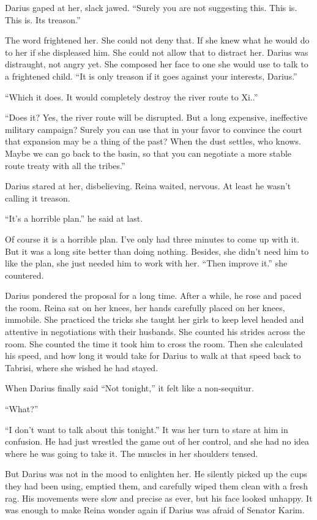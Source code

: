 \documentclass{article}
\begin{document}
	Darius gaped at her, slack jawed. “Surely you are not suggesting this. This is. This is. Its treason.”
	
	The word frightened her. She could not deny that. If she knew what he would do to her if she displeased him. She could not allow that to distract her. Darius was distraught, not angry yet. She composed her face to one she would use to talk to a frightened child. “It is only treason if it goes against your interests, Darius.” 
	
	
	“Which it does. It would completely destroy the river route to Xi..” 
	
	“Does it? Yes, the river route will be disrupted. But a long expensive, ineffective military campaign? Surely you can use that in your favor to convince the court that expansion may be a thing of the past? When the dust settles, who knows. Maybe we can go back to the basin, so that you can negotiate a more stable route treaty with all the tribes.”
	
	Darius stared at her, disbelieving. Reina waited, nervous.  At least he wasn’t calling it treason.
	
	“It's a horrible plan.” he said at last.
	
	Of course it is a horrible plan. I’ve only had three minutes to come up with it. But it was a long site better than doing nothing. Besides, she didn’t need him to like the plan, she just needed him to work with her. “Then improve it.” she countered.
	
	Darius pondered the proposal for a long time. After a while, he rose and paced the room. Reina sat on her knees, her hands carefully placed on her knees, immobile. She practiced the tricks she taught her girls to keep level headed and attentive in negotiations with their husbands. She counted his strides across the room. She counted the time it took him to cross the room. Then she calculated his speed, and how long it would take for Darius to walk at that speed back to Tabrisi, where she wished he had stayed.
	
	When Darius finally said “Not tonight,” it felt like a non-sequitur.
	
	“What?”
	
	“I don’t want to talk about this tonight.” It was her turn to stare at him in confusion. He had just wrestled the game out of her control, and she had no idea where he was going to take it. The muscles in her shoulders tensed.
	
	But Darius was not in the mood to enlighten her. He silently picked up the cups they had been using, emptied them, and carefully wiped them clean with a fresh rag. His movements were slow and precise as ever, but his face looked unhappy. It was enough to make Reina wonder again if Darius was afraid of Senator Karim. 
	
\end{document}
